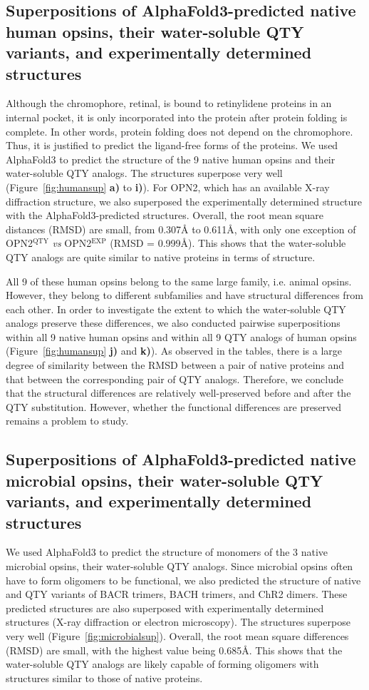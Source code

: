 \documentclass[fleqn, 10pt]{manuscript}
\begin{document}
\subsection*{Superpositions of AlphaFold3-predicted native human opsins, their water-soluble QTY variants, and experimentally determined structures}

Although the chromophore, retinal, is bound to retinylidene proteins in an internal pocket, it is only incorporated into the protein after protein folding is complete. In other words, protein folding does not depend on the chromophore. Thus, it is justified to predict the ligand-free forms of the proteins. We used AlphaFold3 to predict the structure of the 9 native human opsins and their water-soluble QTY analogs. The structures superpose very well (Figure~\ref{fig:humansup} \textbf{a)} to \textbf{i)}). For OPN2, which has an available X-ray diffraction structure, we also superposed the experimentally determined structure with the AlphaFold3-predicted structures. Overall, the root mean square distances (RMSD) are small, from 0.307{\AA} to 0.611\AA, with only one exception of OPN2$^{\textrm{QTY}}$ \textit{vs} OPN2$^{\textrm{EXP}}$ (RMSD = 0.999\AA). This shows that the water-soluble QTY analogs are quite similar to native proteins in terms of structure. 

All 9 of these human opsins belong to the same large family, i.e. animal opsins. However, they belong to different subfamilies and have structural differences from each other. In order to investigate the extent to which the water-soluble QTY analogs preserve these differences, we also conducted pairwise superpositions within all 9 native human opsins and within all 9 QTY analogs of human opsins (Figure~\ref{fig:humansup} \textbf{j)} and \textbf{k)}). As observed in the tables, there is a large degree of similarity between the RMSD between a pair of native proteins and that between the corresponding pair of QTY analogs. Therefore, we conclude that the structural differences are relatively well-preserved before and after the QTY substitution. However, whether the functional differences are preserved remains a problem to study. 

\subsection*{Superpositions of AlphaFold3-predicted native microbial opsins, their water-soluble QTY variants, and experimentally determined structures}

We used AlphaFold3 to predict the structure of monomers of the 3 native microbial opsins, their water-soluble QTY analogs. Since microbial opsins often have to form oligomers to be functional, we also predicted the structure of native and QTY variants of BACR trimers, BACH trimers, and ChR2 dimers. These predicted structures are also superposed with experimentally determined structures (X-ray diffraction or electron microscopy). The structures superpose very well (Figure~\ref{fig:microbialsup}). Overall, the root mean square differences (RMSD) are small, with the highest value being 0.685\AA. This shows that the water-soluble QTY analogs are likely capable of forming oligomers with structures similar to those of native proteins. 
\end{document}
